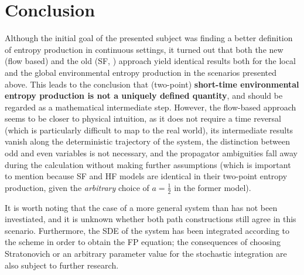 \section{Conclusion}

Although the initial goal of the presented subject was finding a better definition of entropy production in continuous settings, it turned out that both the new (flow based) and the old (SF, \cite{sf}) approach yield identical results both for the local and the global environmental entropy production in the scenarios presented above. This leads to the conclusion that (two-point) \textbf{short-time environmental entropy production is not a uniquely defined quantity}, and should be regarded as a mathematical intermediate step. However, the flow-based approach seems to be closer to physical intuition, as it does not require a time reversal (which is particularly difficult to map to the real world), its intermediate results vanish along the deterministic trajectory of the system, the distinction between odd and even variables is not necessary, and the propagator ambiguities fall away during the calculation without making further assumptions (which is important to mention because SF and HF models are identical in their two-point entropy production, given the \emph{arbitrary} choice of \(a = \tfrac12\) in the former model).

It is worth noting that the case of a more general system than  has not been investiated, and it is unknown whether both path constructions still agree in this scenario. Furthermore, the SDE of the system has been integrated according to the \Ito{} scheme in order to obtain the FP equation; the consequences of choosing Stratonovich or an arbitrary parameter value for the stochastic integration are also subject to further research.




